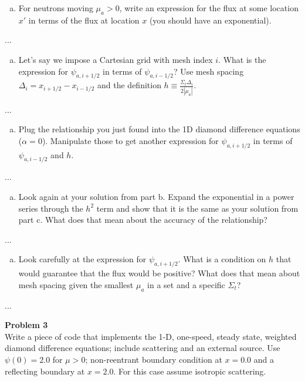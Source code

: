 \documentclass[10pt]{article}
\begin{document}
\begin{enumerate}[(a)]
\item For neutrons moving $\mu_a > 0$, write an expression for the flux at some location $x'$ in terms of the flux at location $x$ (you should have an exponential).
\end{enumerate}

...


\begin{enumerate}[(b)]
\item Let's say we impose a Cartesian grid with mesh index $i$. What is the expression for $\psi_{a,i+1/2}$ in terms of $\psi_{a,i-1/2}$? Use mesh spacing $\Delta_i = x_{i+1/2} - x_{i-1/2}$ and the definition $h \equiv \frac{\Sigma_t \Delta_i}{2|\mu_a|}$.
\end{enumerate}

...


\begin{enumerate}[(c)]
\item Plug the relationship you just found into the 1D diamond difference equations ($\alpha = 0$). Manipulate those to get another expression for
 $\psi_{a,i+1/2}$ in terms of $\psi_{a,i-1/2}$ and $h$.
\end{enumerate}

...


\begin{enumerate}[(d)]
\item Look again at your solution from part b. Expand the exponential in a power series through the $h^2$ term and show that it is the same as your solution from part c. What does that mean about the accuracy of the relationship?
\end{enumerate}

...


\begin{enumerate}[(e)]
\item Look carefully at the expression for
$\psi_{a,i+1/2}$. What is a condition on $h$ that would guarantee that the flux would be positive? What does that mean about mesh spacing given the smallest $\mu_a$ in a set and a specific $\Sigma_t$?
\end{enumerate}

...






\newpage
\noindent \textbf{Problem 3}\\
Write a piece of code that implements the 1-D, one-speed, steady state, weighted diamond difference equations; include scattering and an external source. Use $\psi(0) = 2.0$ for $\mu > 0$; non-reentrant boundary condition at $x=0.0$ and a reflecting boundary at $x=2.0$. For this case assume isotropic scattering.
\end{document}
